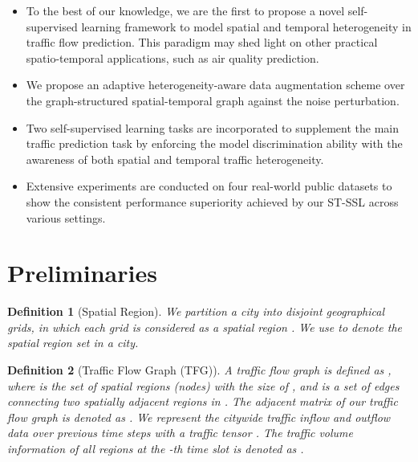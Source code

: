 \documentclass[letterpaper]{article} \usepackage{aaai23}  \usepackage{times}  \usepackage{helvet}  \usepackage{courier}  \usepackage[hyphens]{url}  \usepackage{graphicx} \urlstyle{rm} \def\UrlFont{\rm}  \usepackage{natbib}  \usepackage{caption} \frenchspacing  \setlength{\pdfpagewidth}{8.5in} \setlength{\pdfpageheight}{11in}
\newtheorem{mydef}{Definition}
\newcommand{\name}{ST-SSL\xspace}
\begin{document}
\begin{itemize}
    \item To the best of our knowledge, we are the first to propose a novel self-supervised learning framework to model spatial and temporal heterogeneity in traffic flow prediction. This paradigm may shed light on other practical spatio-temporal applications, such as air quality prediction.
    


    \item We propose an adaptive heterogeneity-aware data augmentation scheme over the graph-structured spatial-temporal graph against the noise perturbation. 
    


    \item Two self-supervised learning tasks are incorporated to supplement the main traffic prediction task by enforcing the model discrimination ability with the awareness of both spatial and temporal traffic heterogeneity. 
    


    \item Extensive experiments are conducted on four real-world public datasets to show the consistent performance superiority achieved by our \name across various settings.
    
\end{itemize}











\section{Preliminaries}\label{sec:pre}




\begin{mydef}[Spatial Region]
We partition a city into  disjoint geographical grids, in which each grid is considered as a spatial region . We use  to denote the spatial region set in a city. 
\end{mydef}





\begin{mydef}[Traffic Flow Graph (TFG)]
A traffic flow graph is defined as , where  is the set of spatial regions (nodes) with the size of , and  is a set of edges connecting two spatially adjacent regions in . The adjacent matrix of our traffic flow graph is denoted as . We represent the citywide traffic inflow and outflow data over previous  time steps with a traffic tensor . The traffic volume information of all regions  at the -th time slot is denoted as . 
\end{mydef}
\end{document}
